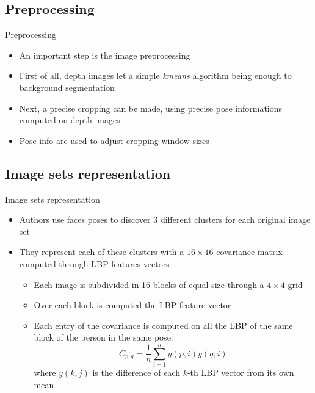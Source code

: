 \documentclass[unknownkeysallowed]{beamer}
\begin{document}
\subsection{Preprocessing}
\begin{frame}{Preprocessing}
	\begin{itemize}
		\item An important step is the image preprocessing
		\item First of all, depth images let a simple \textit{kmeans}
			algorithm being enough to background segmentation
		\item Next, a precise cropping can be made, using precise pose
			informations computed on depth images
		\item Pose info are used to adjust cropping window sizes
	\end{itemize}
\end{frame}

\subsection{Image sets representation}
\begin{frame}{Image sets representation}
	\begin{itemize}
		\item Authors use faces poses to discover 3 different clusters
			for each original image set
		\item They represent each of these clusters with a $16 \times
			16$ covariance matrix computed through LBP features
			vectors
			\begin{itemize}
				\item Each image is subdivided in 16 blocks of
					equal size through a $4 \times 4$ grid
				\item Over each block is computed the LBP
					feature vector
				\item Each entry of the covariance is computed
					on all the LBP of the same block of the
					person in the same pose:
					$$
					C_{p, q} = \frac{1}{n} \sum_{i=1}^n
					y(p, i)y(q, i)
					$$
					where $y(k, j)$ is the difference of
					each $k$-th LBP vector from
					its own mean

			\end{itemize}
	\end{itemize}
\end{frame}
\end{document}
